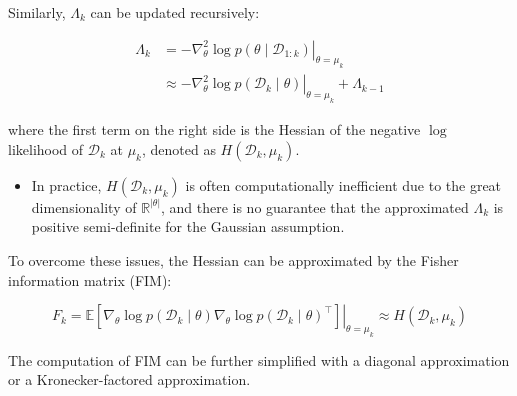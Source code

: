 \documentclass[9pt,dvipsnames]{beamer}
\begin{document}
\begin{frame}
    Similarly, $\Lambda_{k}$ can be updated recursively:

    $$
        \begin{aligned}
            \Lambda_{k} & =-\left.\nabla_{\theta}^{2} \log p\left(\theta \mid \mathcal{D}_{1: k}\right)\right|_{\theta=\mu_{k}}                  \\
                        & \approx-\left.\nabla_{\theta}^{2} \log p\left(\mathcal{D}_{k} \mid \theta\right)\right|_{\theta=\mu_{k}}+\Lambda_{k-1}
        \end{aligned}
    $$

    where the first term on the right side is the Hessian of the negative $\log$ likelihood of $\mathcal{D}_{k}$ at $\mu_{k}$, denoted as $H\left(\mathcal{D}_{k}, \mu_{k}\right)$.
    \begin{itemize}
        \item In practice, $H\left(\mathcal{D}_{k}, \mu_{k}\right)$ is often computationally inefficient due to the great dimensionality of $\mathbb{R}^{|\theta|}$, and there is no guarantee that the approximated $\Lambda_{k}$ is positive semi-definite for the Gaussian assumption.
    \end{itemize}
    To overcome these issues, the Hessian can be approximated by the Fisher information matrix (FIM):

    $$F_{k}=\left.\mathbb{E}\left[\nabla_{\theta} \log p\left(\mathcal{D}_{k} \mid \theta\right) \nabla_{\theta} \log p\left(\mathcal{D}_{k} \mid \theta\right)^{\top}\right]\right|_{\theta=\mu_{k}} \approx H\left(\mathcal{D}_{k}, \mu_{k}\right)$$

    The computation of FIM can be further simplified with a diagonal approximation or a Kronecker-factored approximation.
\end{frame}
\end{document}

